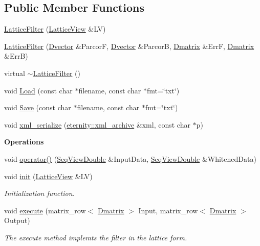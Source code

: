 \subsection*{Public Member Functions}
\begin{DoxyCompactItemize}
\item 
\hyperlink{classtsa_1_1_lattice_filter_a2cd66baf212f1b3824016c1e589b014a}{Lattice\+Filter} (\hyperlink{classtsa_1_1_lattice_view}{Lattice\+View} \&LV)
\item 
\hyperlink{classtsa_1_1_lattice_filter_af2e6c3e8d7fb7399f564f47c060bccc3}{Lattice\+Filter} (\hyperlink{namespacetsa_a8900fb03d849baf447a1a0efe2561fb2}{Dvector} \&ParcorF, \hyperlink{namespacetsa_a8900fb03d849baf447a1a0efe2561fb2}{Dvector} \&ParcorB, \hyperlink{namespacetsa_ad260cd21c1891c4ed391fe788569aba4}{Dmatrix} \&ErrF, \hyperlink{namespacetsa_ad260cd21c1891c4ed391fe788569aba4}{Dmatrix} \&ErrB)
\item 
virtual \hyperlink{classtsa_1_1_lattice_filter_a8a7c4763fe464837766a5beff88d36d5}{$\sim$\+Lattice\+Filter} ()
\item 
void \hyperlink{classtsa_1_1_lattice_filter_aa6be240d902449711c1925e464248a1d}{Load} (const char $\ast$filename, const char $\ast$fmt=\char`\"{}txt\char`\"{})
\item 
void \hyperlink{classtsa_1_1_lattice_filter_ac599ab3a2134d53e0685f91a0a673ed4}{Save} (const char $\ast$filename, const char $\ast$fmt=\char`\"{}txt\char`\"{})
\item 
void \hyperlink{classtsa_1_1_lattice_filter_ae9bd581cbcd1183a0dd7c557fe687422}{xml\+\_\+serialize} (\hyperlink{classeternity_1_1xml__archive}{eternity\+::xml\+\_\+archive} \&xml, const char $\ast$p)
\end{DoxyCompactItemize}
\begin{Indent}\textbf{ Operations}\par
\begin{DoxyCompactItemize}
\item 
void \hyperlink{classtsa_1_1_lattice_filter_a01071f8619620099315c1007c8980baf}{operator()} (\hyperlink{namespacetsa_ac599574bcc094eda25613724b8f3ca9e}{Seq\+View\+Double} \&Input\+Data, \hyperlink{namespacetsa_ac599574bcc094eda25613724b8f3ca9e}{Seq\+View\+Double} \&Whitened\+Data)
\item 
void \hyperlink{classtsa_1_1_lattice_filter_a08187ed236faefa36a0993190c6b0162}{init} (\hyperlink{classtsa_1_1_lattice_view}{Lattice\+View} \&LV)
\begin{DoxyCompactList}\small\item\em Initialization function. \end{DoxyCompactList}\item 
void \hyperlink{classtsa_1_1_lattice_filter_a09ebe977a54eed4453db605ab742f771}{execute} (matrix\+\_\+row$<$ \hyperlink{namespacetsa_ad260cd21c1891c4ed391fe788569aba4}{Dmatrix} $>$ Input, matrix\+\_\+row$<$ \hyperlink{namespacetsa_ad260cd21c1891c4ed391fe788569aba4}{Dmatrix} $>$ Output)
\begin{DoxyCompactList}\small\item\em The execute method implemts the filter in the lattice form. \end{DoxyCompactList}\end{DoxyCompactItemize}
\end{Indent}
